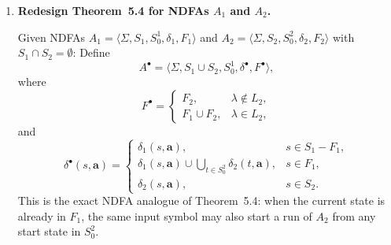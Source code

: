 \begin{enumerate}[{5.}1. ]
This makes the copied start states both start states and final states, so
$\lambda$ is accepted immediately, and every time a copy of a word from $L$ is
finished, the machine may jump by a $\lambda$-move to a copied start state and
begin another copy.

\textbf{Why it works.}  If $x=x_1x_2\cdots x_n$ with each $x_i\in L$, start in a
copied start state corresponding to the start used for $x_1$, follow the old
transitions while reading $x_1$, jump by $\lambda$ from the reached final state
to a copied start state for $x_2$, and continue.  Thus every word of $L^*$ is
accepted.

Conversely, every accepting computation starts in a copied start state, and the
only way to enter a copied start state later is by a $\lambda$-move from a final
state.  Therefore the input splits into consecutive blocks, each of which takes
the machine from some copied start state through the old machine to a final
state.  Replacing each copied start state by its original partner in $S_0$
shows that each block lies in $L$.  Hence the whole input lies in $L^*$.

So this redesign does make the single extra start state $q_0$ unnecessary: the
role of ``accept $\lambda$ and restart a new factor'' is carried by copied start
states together with $\lambda$-transitions from final states.

\item \textbf{Redesign Theorem~5.4 for NDFAs $A_1$ and $A_2$.}

Given NDFAs $A_1=\langle\Sigma,S_1,S^1_0,\delta_1,F_1\rangle$ and $A_2=\langle\Sigma,S_2,S^2_0,\delta_2,F_2\rangle$ with $S_1\cap S_2=\emptyset$:
Define
\[
A^\bullet=\langle\Sigma,S_1\cup S_2,S^1_0,\delta^\bullet,F^\bullet\rangle,
\]
where
\[
F^\bullet=
\left\{
\begin{array}{ll}
F_2, & \lambda\notin L_2,\\
F_1\cup F_2, & \lambda\in L_2,
\end{array}
\right.
\]
and
\[
\delta^\bullet(s,\pmb{a})=
\left\{
\begin{array}{ll}
\delta_1(s,\pmb{a}), & s\in S_1-F_1,\\
\delta_1(s,\pmb{a})\cup\displaystyle\bigcup_{t\in S^2_0}\delta_2(t,\pmb{a}),
  & s\in F_1,\\
\delta_2(s,\pmb{a}), & s\in S_2.
\end{array}
\right.
\]
This is the exact NDFA analogue of Theorem~5.4: when the current state is
already in $F_1$, the same input symbol may also start a run of $A_2$ from any
start state in $S^2_0$.


\end{enumerate}
